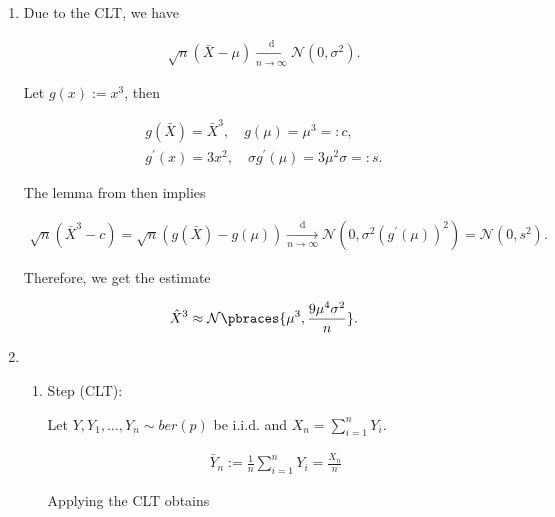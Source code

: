 \begin{solution}

\phantom{}

\begin{enumerate}[label = (\alph*)]

    \item Due to the CLT, we have \cite[Lecture 4, Slide 59]{EStat}
    
    \begin{align*}
        \sqrt n (\bar X - \mu) \xrightarrow[n \to \infty]{\mathrm d} \mathcal N(0, \sigma^2).
    \end{align*}

    Let $g(x) := x^3$, then

    \begin{gather*}
        g(\bar X) = \bar X ^3, \quad g(\mu) = \mu^3 =: c, \\
        g^\prime(x) = 3 x^2, \quad \sigma g^\prime(\mu) = 3 \mu^2 \sigma =: s.
    \end{gather*}

    The lemma from \cite*[Lecture 5, Slide 10]{EStat} then implies

    \begin{align*}
        \sqrt n (\bar X^3 - c)
        =
        \sqrt n (g(\bar X) - g(\mu))
        \xrightarrow[n \to \infty]{\mathrm d}
        \mathcal N(0, \sigma^2 (g^\prime(\mu))^2)
        =
        \mathcal N(0, s^2).
    \end{align*}

    Therefore, we get the estimate

    \begin{align*}
        \hat X^3
        \approx
        \mathcal N \pbraces{\mu^3, \frac{9 \mu^4 \sigma^2}{n}}.
    \end{align*}

    \item

    \begin{enumerate}[label = \arabic*.]

        \item Step (CLT):
        
        Let $Y, Y_1, \dots, Y_n \sim \mathit{ber}(p)$ be i.i.d. and $X_n = \sum_{i=1}^n Y_i$.

        \begin{align*}
            \bar Y_n := \frac{1}{n} \sum_{i=1}^n Y_i = \frac{X_n}{n}
        \end{align*}

        Applying the CLT obtains


\end{enumerate}
\end{enumerate}
\end{solution}
